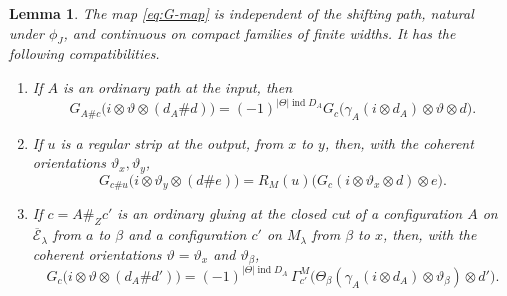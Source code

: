 \documentclass[11pt]{amsart}
\newtheorem{lemma}[theorem]{Lemma}
\theoremstyle{definition}
\theoremstyle{remark}
\theoremstyle{plain}
\numberwithin{equation}{section}
\newcommand{\ind}{\operatorname{ind}}
\begin{document}
\begin{lemma}\label{lem:G-properties}
The map \eqref{eq:G-map} is independent of the shifting path, natural
under $\phi_J$, and continuous on compact families of finite widths.
It has the following compatibilities.
\begin{enumerate}[label=(\roman*)]
\item If $A$ is an ordinary path at the input, then
\[
 G_{A\#c}\bigl(i\otimes \vartheta\otimes(d_A\# d)\bigr)
 =(-1)^{|\Theta|\ind D_A}G_c\bigl(\gamma_A(i\otimes d_A)\otimes \vartheta\otimes d\bigr).
\]
\item If $u$ is a regular strip at the output, from $x$ to $y$, then,
with the coherent orientations $\vartheta_x,\vartheta_y$,
\[
 G_{c\#u}\bigl(i\otimes \vartheta_y\otimes(d\# e)\bigr)
 =R_M(u)\bigl(G_c(i\otimes \vartheta_x\otimes d)\otimes e\bigr).
\]
\item If $c=A\#_Zc'$ is an ordinary gluing at the closed cut of a
configuration $A$ on $\overline{\mathcal E}_\lambda$ from $a$ to $\beta$ and a
configuration $c'$ on $M_\lambda$ from $\beta$ to $x$, then, with
the coherent orientations $\vartheta=\vartheta_x$ and $\vartheta_\beta$,
\[
 G_c\bigl(i\otimes \vartheta\otimes(d_A\# d')\bigr)
 =(-1)^{|\Theta|\ind D_A}\,
   \Gamma^M_{c'}\bigl(\Theta_\beta(\gamma_A(i\otimes d_A)\otimes \vartheta_\beta)
                        \otimes d'\bigr).
\]
\end{enumerate}
\end{lemma}
\end{document}
